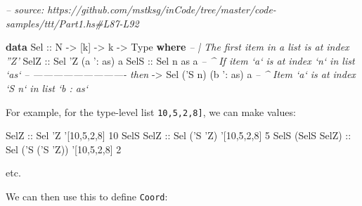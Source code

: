 \documentclass[]{article}
\newenvironment{Shaded}{}{}
\newcommand{\CommentTok}[1]{\textcolor[rgb]{0.38,0.63,0.69}{\textit{#1}}}
\newcommand{\DataTypeTok}[1]{\textcolor[rgb]{0.56,0.13,0.00}{#1}}
\newcommand{\DecValTok}[1]{\textcolor[rgb]{0.25,0.63,0.44}{#1}}
\newcommand{\FunctionTok}[1]{\textcolor[rgb]{0.02,0.16,0.49}{#1}}
\newcommand{\KeywordTok}[1]{\textcolor[rgb]{0.00,0.44,0.13}{\textbf{#1}}}
\newcommand{\NormalTok}[1]{#1}
\newcommand{\OtherTok}[1]{\textcolor[rgb]{0.00,0.44,0.13}{#1}}
\begin{document}
\begin{Shaded}
\begin{Highlighting}[]
\CommentTok{-- source: https://github.com/mstksg/inCode/tree/master/code-samples/ttt/Part1.hs#L87-L92}

\KeywordTok{data} \DataTypeTok{Sel}\OtherTok{ ::} \DataTypeTok{N} \OtherTok{->}\NormalTok{ [k] }\OtherTok{->}\NormalTok{ k }\OtherTok{->} \DataTypeTok{Type} \KeywordTok{where}
    \CommentTok{-- | The first item in a list is at index ''Z'}
    \DataTypeTok{SelZ}\OtherTok{ ::} \DataTypeTok{Sel}\NormalTok{ '}\DataTypeTok{Z}\NormalTok{ (a '}\FunctionTok{:}\NormalTok{ as) a}
    \DataTypeTok{SelS}\OtherTok{ ::} \DataTypeTok{Sel}\NormalTok{     n        as  a  }\CommentTok{-- ^ If item `a` is at index `n` in list `as`}
         \CommentTok{-- ---------------------------- then}
         \OtherTok{->} \DataTypeTok{Sel}\NormalTok{ ('}\DataTypeTok{S}\NormalTok{ n) (b '}\FunctionTok{:}\NormalTok{ as) a  }\CommentTok{-- ^ Item `a` is at index `S n` in list `b : as`}
\end{Highlighting}
\end{Shaded}

For example, for the type-level list \texttt{\textquotesingle{}{[}10,5,2,8{]}},
we can make values:

\begin{Shaded}
\begin{Highlighting}[]
\DataTypeTok{SelZ}\OtherTok{             ::} \DataTypeTok{Sel}\NormalTok{         '}\DataTypeTok{Z}\NormalTok{   '[}\DecValTok{10}\NormalTok{,}\DecValTok{5}\NormalTok{,}\DecValTok{2}\NormalTok{,}\DecValTok{8}\NormalTok{] }\DecValTok{10}
\DataTypeTok{SelS} \DataTypeTok{SelZ}\OtherTok{        ::} \DataTypeTok{Sel}\NormalTok{     ('}\DataTypeTok{S}\NormalTok{ '}\DataTypeTok{Z}\NormalTok{)  '[}\DecValTok{10}\NormalTok{,}\DecValTok{5}\NormalTok{,}\DecValTok{2}\NormalTok{,}\DecValTok{8}\NormalTok{] }\DecValTok{5}
\DataTypeTok{SelS}\NormalTok{ (}\DataTypeTok{SelS} \DataTypeTok{SelZ}\NormalTok{)}\OtherTok{ ::} \DataTypeTok{Sel}\NormalTok{ ('}\DataTypeTok{S}\NormalTok{ ('}\DataTypeTok{S}\NormalTok{ '}\DataTypeTok{Z}\NormalTok{)) '[}\DecValTok{10}\NormalTok{,}\DecValTok{5}\NormalTok{,}\DecValTok{2}\NormalTok{,}\DecValTok{8}\NormalTok{] }\DecValTok{2}
\end{Highlighting}
\end{Shaded}

etc.

We can then use this to define \texttt{Coord}:
\end{document}
